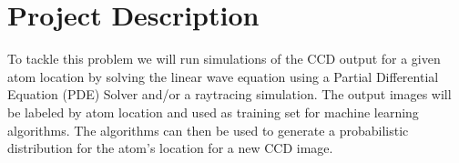 \section{Project Description}
To tackle this problem we will run simulations of the CCD output for a given atom location by solving the linear wave equation using a Partial Differential Equation (PDE) Solver and/or a raytracing simulation.  The output images will be labeled by atom location and used as training set for machine learning algorithms.  The algorithms can then be used to generate a probabilistic distribution for the atom's location for a new CCD image.




